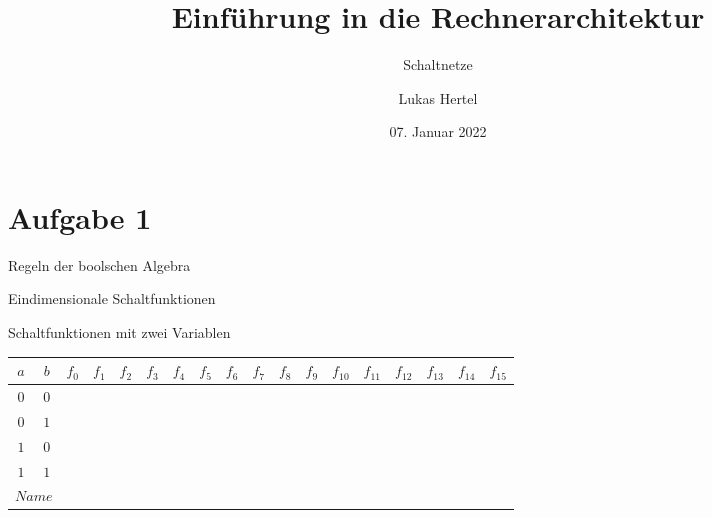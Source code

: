 \documentclass[
  german,            %
  aspectratio=169,    %
  sectionpage=false,   %
]{tumbeamer}
\title{Einführung in die Rechnerarchitektur}
\subtitle{Schaltnetze}
\author{Lukas Hertel}
\institute{\theChairName\\\theDepartmentName\\\theUniversityName}
\date[07.01.2022]{07. Januar 2022}
\begin{document}
\maketitle

\section{Aufgabe 1}
\begin{frame}{Regeln der boolschen Algebra}

\end{frame}
\begin{frame}{Eindimensionale Schaltfunktionen}
\end{frame}
\begin{frame}{Schaltfunktionen mit zwei Variablen}
		\begin{center}\begin{tabular}{|cc|cccccccccccccccc|}
			\hline
			$a$ & $b$ & $f_0$ & $f_1$ & $f_2$ & $f_3$ & $f_4$ & $f_5$ & $f_6$ & $f_7$ & $f_8$ & $f_9$ & $f_{10}$ & $f_{11}$ & $f_{12}$ & $f_{13}$ & $f_{14}$ & $f_{15}$ \\
			\hline
			$0$ & $0$ & & & & & & & & & & & & & & & &
			\\			
			$0$ & $1$ & & & & & & & & & & & & & & & &
			\\
			$1$ & $0$ & & & & & & & & & & & & & & & &
			\\
			$1$ & $1$ & & & & & & & & & & & & & & & &
			\\
			\multicolumn{2}{|c|}{$Name$} & & & & & & & & & & & & & & & & 
			\\
			
			\hline
	\end{tabular}\end{center}
\end{frame}
\end{document}
